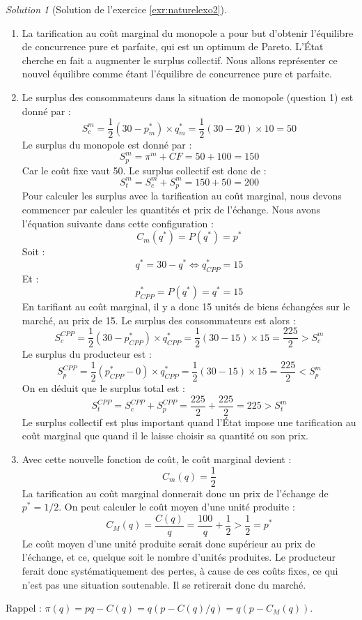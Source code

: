 \documentclass[
]{book}
\theoremstyle{definition}
\theoremstyle{definition}
\theoremstyle{definition}
\theoremstyle{definition}
\theoremstyle{remark}
\newtheorem*{solution}{Solution}
\begin{document}
\begin{solution}[Solution de l'exercice \ref{exr:naturelexo2}]
\begin{enumerate}
\def\labelenumi{\arabic{enumi}.}
\setcounter{enumi}{1}
\item
  La tarification au coût marginal du monopole a pour but d'obtenir l'équilibre de concurrence pure et parfaite, qui est un optimum de Pareto.
  L'État cherche en fait a augmenter le surplus collectif.
  Nous allons représenter ce nouvel équilibre comme étant l'équilibre de concurrence pure et parfaite.
\item
  Le surplus des consommateurs dans la situation de monopole (question 1) est donné par :
  \[S_c^m=\frac{1}{2}(30-p_m^*)\times q_m^*=\frac{1}{2}(30-20)\times 10=50\]
  Le surplus du monopole est donné par :
  \[S_p^m=\pi^m+CF=50+100=150\]
  Car le coût fixe vaut 50.
  Le surplus collectif est donc de :
  \[S_t^m=S_c^m+S_p^m=150+50=200\]
  Pour calculer les surplus avec la tarification au coût marginal, nous devons commencer par calculer les quantités et prix de l'échange.
  Nous avons l'équation suivante dans cette configuration :
  \[C_m(q^*)=P(q^*)=p^*\]
  Soit :
  \[q^*=30-q^*\Leftrightarrow q^*_{CPP}=15\]
  Et :
  \[p^*_{CPP}=P(q^*)=q^*=15\]
  En tarifiant au coût marginal, il y a donc 15 unités de biens échangées sur le marché, au prix de 15.
  Le surplus des consommateurs est alors :
  \[S_c^{CPP}=\frac{1}{2}(30-p_{CPP}^*)\times q_{CPP}^*=\frac{1}{2}(30-15)\times 15=\frac{225}{2}>S_c^m\]
  Le surplus du producteur est :
  \[S_p^{CPP}=\frac{1}{2}(p_{CPP}^*-0)\times q_{CPP}^*=\frac{1}{2}(30-15)\times 15=\frac{225}{2}<S_p^m\]
  On en déduit que le surplus total est :
  \[S_t^{CPP}=S_c^{CPP}+S_p^{CPP}=\frac{225}{2}+\frac{225}{2}=225>S_t^m\]
  Le surplus collectif est plus important quand l'État impose une tarification au coût marginal que quand il le laisse choisir sa quantité ou son prix.
\item
  Avec cette nouvelle fonction de coût, le coût marginal devient :
  \[C_m(q)=\frac{1}{2}\]
  La tarification au coût marginal donnerait donc un prix de l'échange de \(p^*=1/2\).
  On peut calculer le coût moyen d'une unité produite :
  \[C_M(q)=\frac{C(q)}{q}=\frac{100}{q}+\frac{1}{2}>\frac{1}{2}=p^*\]
  Le coût moyen d'une unité produite serait donc supérieur au prix de l'échange, et ce, quelque soit le nombre d'unités produites.
  Le producteur ferait donc systématiquement des pertes, à cause de ces coûts fixes, ce qui n'est pas une situation soutenable.
  Il se retirerait donc du marché.
\end{enumerate}

Rappel : \(\pi(q)=pq-C(q)=q(p-C(q)/q)=q(p-C_M(q))\).


\end{solution}
\end{document}
